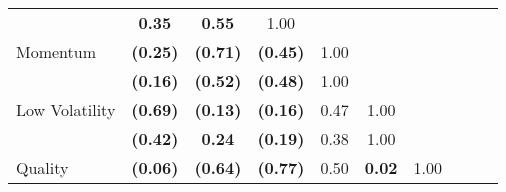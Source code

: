 \documentclass[12pt]{article}
\begin{document}
\begin{table}[H]
\begin{center}
{\begin{tabular}{@{}lccccccccc@{}}
                      & {\color[HTML]{303498} \textbf{0.35}}   & {\color[HTML]{303498} \textbf{0.55}}   & {\color[HTML]{303498} 1.00}            & \multicolumn{1}{l}{}                   & \multicolumn{1}{l}{}                   & \multicolumn{1}{l}{}                   & \multicolumn{1}{l}{}                   & \multicolumn{1}{l}{}                   & \multicolumn{1}{l}{}                   \\
Momentum              & \textbf{(0.25)}                        & \textbf{(0.71)}                        & \textbf{(0.45)}                        & 1.00                                   & \textbf{}                              & \textbf{}                              & \textbf{}                              & \textbf{}                              & \textbf{}                              \\
                      & {\color[HTML]{303498} \textbf{(0.16)}} & {\color[HTML]{303498} \textbf{(0.52)}} & {\color[HTML]{303498} \textbf{(0.48)}} & {\color[HTML]{303498} 1.00}            & \multicolumn{1}{l}{}                   & \multicolumn{1}{l}{}                   & \multicolumn{1}{l}{}                   & \multicolumn{1}{l}{}                   & \multicolumn{1}{l}{}                   \\
Low Volatility        & \textbf{(0.69)}                        & \textbf{(0.13)}                        & \textbf{(0.16)}                        & 0.47                                   & 1.00                                   & \textbf{}                              & \textbf{}                              & \textbf{}                              & \textbf{}                              \\
                      & {\color[HTML]{303498} \textbf{(0.42)}} & {\color[HTML]{303498} \textbf{0.24}}   & {\color[HTML]{303498} \textbf{(0.19)}} & {\color[HTML]{303498} 0.38}            & {\color[HTML]{303498} 1.00}            & \multicolumn{1}{l}{}                   & \multicolumn{1}{l}{}                   & \multicolumn{1}{l}{}                   & \multicolumn{1}{l}{}                   \\
Quality               & \textbf{(0.06)}                        & \textbf{(0.64)}                        & \textbf{(0.77)}                        & 0.50                                   & \textbf{0.02}                          & 1.00                                   & \textbf{}                              & \textbf{}                              & \textbf{}                              \\

\end{tabular}}
\end{center}
\end{table}
\end{document}
